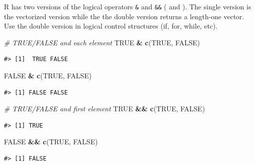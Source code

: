 \documentclass[]{book}
\newenvironment{Shaded}{\begin{snugshade}}{\end{snugshade}}
\newcommand{\KeywordTok}[1]{\textcolor[rgb]{0.13,0.29,0.53}{\textbf{#1}}}
\newcommand{\StringTok}[1]{\textcolor[rgb]{0.31,0.60,0.02}{#1}}
\newcommand{\CommentTok}[1]{\textcolor[rgb]{0.56,0.35,0.01}{\textit{#1}}}
\newcommand{\OtherTok}[1]{\textcolor[rgb]{0.56,0.35,0.01}{#1}}
\newcommand{\OperatorTok}[1]{\textcolor[rgb]{0.81,0.36,0.00}{\textbf{#1}}}
\newcommand{\NormalTok}[1]{#1}
\theoremstyle{definition}
\theoremstyle{definition}
\theoremstyle{definition}
\theoremstyle{remark}
\begin{document}
R has two versions of the logical operators \texttt{\&} and
\texttt{\&\&} (\texttt{\textbar{}} and \texttt{\textbar{}\textbar{}}).
The single version is the vectorized version while the the double
version returns a length-one vector. Use the double version in logical
control structures (if, for, while, etc).

\begin{Shaded}
\begin{Highlighting}[]
\CommentTok{# TRUE/FALSE and each element}
\OtherTok{TRUE} \OperatorTok{&}\StringTok{ }\KeywordTok{c}\NormalTok{(}\OtherTok{TRUE}\NormalTok{, }\OtherTok{FALSE}\NormalTok{)}
\end{Highlighting}
\end{Shaded}

\begin{verbatim}
#> [1]  TRUE FALSE
\end{verbatim}

\begin{Shaded}
\begin{Highlighting}[]
\OtherTok{FALSE} \OperatorTok{&}\StringTok{ }\KeywordTok{c}\NormalTok{(}\OtherTok{TRUE}\NormalTok{, }\OtherTok{FALSE}\NormalTok{)}
\end{Highlighting}
\end{Shaded}

\begin{verbatim}
#> [1] FALSE FALSE
\end{verbatim}

\begin{Shaded}
\begin{Highlighting}[]
\CommentTok{# TRUE/FALSE and first element}
\OtherTok{TRUE} \OperatorTok{&&}\StringTok{ }\KeywordTok{c}\NormalTok{(}\OtherTok{TRUE}\NormalTok{, }\OtherTok{FALSE}\NormalTok{)}
\end{Highlighting}
\end{Shaded}

\begin{verbatim}
#> [1] TRUE
\end{verbatim}

\begin{Shaded}
\begin{Highlighting}[]
\OtherTok{FALSE} \OperatorTok{&&}\StringTok{ }\KeywordTok{c}\NormalTok{(}\OtherTok{TRUE}\NormalTok{, }\OtherTok{FALSE}\NormalTok{)}
\end{Highlighting}
\end{Shaded}

\begin{verbatim}
#> [1] FALSE
\end{verbatim}
\end{document}
